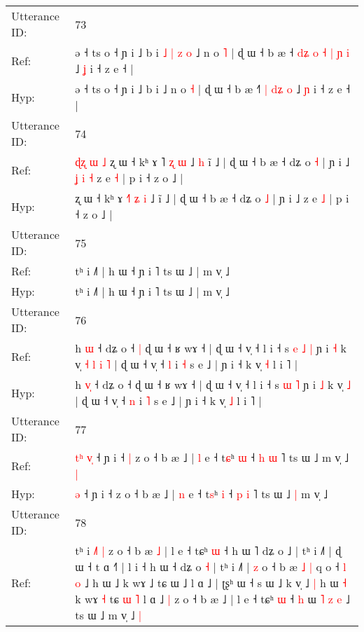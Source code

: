 \documentclass[10pt]{article}
\DeclareRobustCommand{\hl}[1]{{\textcolor{red}{#1}}}
\begin{document}
\begin{longtable}{ll}
 \\
\midrule
Utterance ID: & 73 \\
Ref: & ə ˧ ts o ˧ ɲ i ˩ b i\hl{ }\hl{˩}\hl{ }\hl{|}\hl{ }\hl{z}\hl{ }\hl{o} ˩ n o \hl{˥} | ɖ ɯ ˧ b æ ˧\hl{ }\hl{d}\hl{ʑ}\hl{ }\hl{o} \hl{˧} \hl{|}\hl{ }\hl{ɲ} \hl{i} ˩ \hl{ʝ} i ˧ z e ˧ |
 \\
Hyp: & ə ˧ ts o ˧ ɲ i ˩ b i\hl{}\hl{}\hl{}\hl{}\hl{}\hl{}\hl{}\hl{} ˩ n o \hl{˧} | ɖ ɯ ˧ b æ ˧\hl{}\hl{}\hl{}\hl{}\hl{˥} \hl{|} \hl{}\hl{d}\hl{ʑ} \hl{o} ˩ \hl{ɲ} i ˧ z e ˧ |
 \\
\midrule
Utterance ID: & 74 \\
Ref: & \hl{ɖ}\hl{ʐ}\hl{ }\hl{ɯ}\hl{ }\hl{˩}\hl{ }ʐ ɯ ˧ kʰ ɤ \hl{}˥ \hl{ʐ} \hl{ɯ} ˩\hl{ }\hl{h} ĩ ˩ | ɖ ɯ ˧ b æ ˧ dʑ o \hl{˧} | ɲ i ˩\hl{ }\hl{ʝ}\hl{ }\hl{i}\hl{ }\hl{˧} z e \hl{˧} | p i ˧ z o ˩ |
 \\
Hyp: & \hl{}\hl{}\hl{}\hl{}\hl{}\hl{}\hl{}ʐ ɯ ˧ kʰ ɤ \hl{˧}˥ \hl{ʑ} \hl{i} ˩\hl{}\hl{} ĩ ˩ | ɖ ɯ ˧ b æ ˧ dʑ o \hl{˩} | ɲ i ˩\hl{}\hl{}\hl{}\hl{}\hl{}\hl{} z e \hl{˩} | p i ˧ z o ˩ |
 \\
\midrule
Utterance ID: & 75 \\
Ref: & tʰ i ˩˥ | h ɯ ˧ ɲ i ˥ ts ɯ ˩ | m v̩ ˩
 \\
Hyp: & tʰ i ˩˥ | h ɯ ˧ ɲ i ˥ ts ɯ ˩ | m v̩ ˩
 \\
\midrule
Utterance ID: & 76 \\
Ref: & h \hl{}\hl{ɯ} ˧ dʑ o ˧\hl{ }\hl{|} ɖ ɯ ˧ ʁ wɤ ˧ | ɖ ɯ ˧ v̩ ˧ l i ˧ s\hl{ }\hl{e} \hl{˩} \hl{|} ɲ i \hl{˧} k v̩\hl{ }\hl{˧}\hl{ }\hl{l}\hl{ }\hl{i} \hl{˥} | ɖ ɯ ˧ v̩ ˧ \hl{l} i \hl{˧} s e ˩ | ɲ i ˧ k v̩ \hl{˧} l i ˥ |
 \\
Hyp: & h \hl{v}\hl{̩} ˧ dʑ o ˧\hl{}\hl{} ɖ ɯ ˧ ʁ wɤ ˧ | ɖ ɯ ˧ v̩ ˧ l i ˧ s\hl{}\hl{} \hl{ɯ} \hl{˥} ɲ i \hl{˩} k v̩\hl{}\hl{}\hl{}\hl{}\hl{}\hl{} \hl{˩} | ɖ ɯ ˧ v̩ ˧ \hl{n} i \hl{˥} s e ˩ | ɲ i ˧ k v̩ \hl{˩} l i ˥ |
 \\
\midrule
Utterance ID: & 77 \\
Ref: & \hl{t}\hl{ʰ}\hl{ }\hl{v}\hl{̩} ˧ ɲ i ˧\hl{ }\hl{|} z o ˧ b æ ˩ | \hl{l} e ˧ t\hl{ɕ}ʰ \hl{ɯ} ˧ \hl{h} \hl{ɯ} ˥ ts ɯ ˩\hl{}\hl{} m v̩ ˩\hl{ }\hl{|}
 \\
Hyp: & \hl{}\hl{}\hl{}\hl{}\hl{ə} ˧ ɲ i ˧\hl{}\hl{} z o ˧ b æ ˩ | \hl{n} e ˧ t\hl{s}ʰ \hl{i} ˧ \hl{p} \hl{i} ˥ ts ɯ ˩\hl{ }\hl{|} m v̩ ˩\hl{}\hl{}
 \\
\midrule
Utterance ID: & 78 \\
Ref: & tʰ i\hl{ }\hl{˩}\hl{˥} \hl{|} z o ˧ b æ \hl{˩} | l e ˧ tɕʰ \hl{ɯ} ˧ h ɯ ˥ dʑ o ˩ | tʰ i ˩˥ | ɖ ɯ ˧ t ɑ ˧˥ | l i ˧ h ɯ ˧ dʑ o \hl{˧} | tʰ i ˩˥ | \hl{z} o ˧ b æ\hl{ }\hl{˩} \hl{|} q o ˧ \hl{l}\hl{ }\hl{o} ˩ h ɯ ˩ k wɤ ˩ tɕ ɯ ˩ l ɑ ˩ | ʈʂʰ ɯ ˧ s ɯ ˩ k v̩ ˩\hl{ }\hl{|} h ɯ \hl{˧} k wɤ \hl{˧} tɕ \hl{ɯ} \hl{˥} l ɑ ˩\hl{ }\hl{|} z o ˧ b æ ˩ | l e ˧ tɕʰ \hl{ɯ} ˧\hl{ }\hl{h} ɯ \hl{˥} \hl{z} \hl{e} ˩ ts ɯ ˩\hl{}\hl{} m v̩ ˩\hl{ }\hl{|}

\end{longtable}
\end{document}
